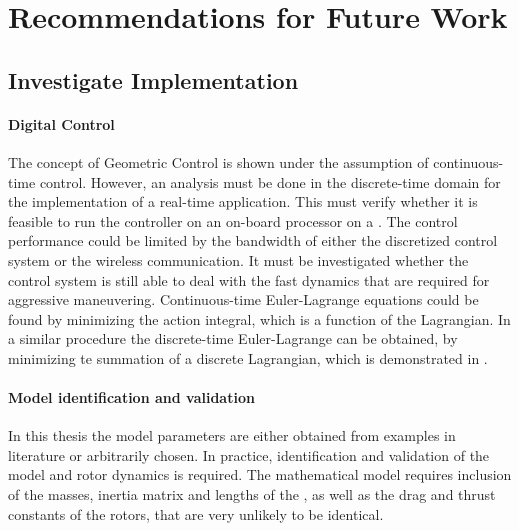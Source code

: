 \section{Recommendations for Future Work}\label{ch:future}

\subsection{Investigate Implementation}

\paragraph{Digital Control} The concept of Geometric Control is shown under the assumption of continuous-time control. 
However, an analysis must be done in the discrete-time domain for the implementation of a real-time application. This must verify whether it is feasible to run the controller on an on-board processor on a . The control performance could be limited by the bandwidth of either the discretized control system or the wireless communication.
It must be investigated whether the control system is still able to deal with the fast dynamics that are required for aggressive maneuvering. 
Continuous-time Euler-Lagrange equations could be found by minimizing the action integral, which is a function of the Lagrangian. In a similar procedure the discrete-time Euler-Lagrange can be obtained, by minimizing te summation of a discrete Lagrangian, which is demonstrated in \cite{Lee2008}. 

\paragraph{Model identification and validation}
In this thesis the model parameters are either obtained from examples in literature or arbitrarily chosen. In practice, identification and validation of the  model and rotor dynamics is required.
The mathematical model requires inclusion of the masses, inertia matrix and lengths of the , as well as the drag and thrust constants of the rotors, that are very unlikely to be identical.

